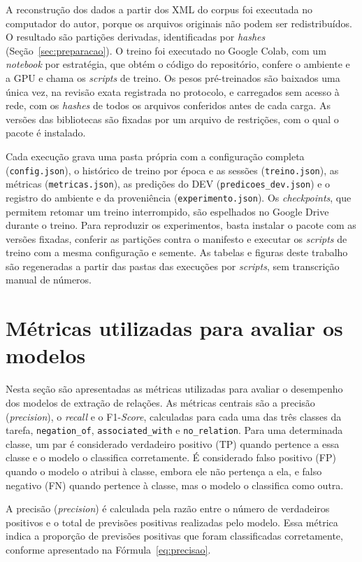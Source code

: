 A reconstrução dos dados a partir dos XML do corpus foi executada no
computador do autor, porque os arquivos originais não podem ser redistribuídos. O
resultado são partições derivadas, identificadas por \emph{hashes}
(Seção~\ref{sec:preparacao}). O treino foi executado no Google Colab, com
um \emph{notebook} por estratégia, que obtém o código do repositório, confere o
ambiente e a GPU e chama os \emph{scripts} de treino. Os pesos pré-treinados são
baixados uma única vez, na revisão exata registrada no protocolo, e carregados sem
acesso à rede, com os \emph{hashes} de todos os arquivos conferidos antes de cada
carga. As versões das bibliotecas são fixadas por um arquivo de restrições, com o
qual o pacote é instalado.

Cada execução grava uma pasta própria com a configuração completa
(\texttt{config.json}), o histórico de treino por época e as sessões
(\texttt{treino.json}), as métricas (\texttt{metricas.json}), as predições do DEV
(\texttt{predicoes\_dev.json}) e o registro do ambiente e da proveniência
(\texttt{experimento.json}). Os \emph{checkpoints}, que permitem retomar um treino
interrompido, são espelhados no Google Drive durante o treino. Para reproduzir os
experimentos, basta instalar o pacote com as versões fixadas, conferir as partições
contra o manifesto e executar os \emph{scripts} de treino com a mesma configuração e
semente. As tabelas e figuras deste trabalho são regeneradas a partir das pastas das
execuções por \emph{scripts}, sem transcrição manual de números.

\section{Métricas utilizadas para avaliar os modelos}
\label{sec:metricas}

Nesta seção são apresentadas as métricas utilizadas para avaliar o desempenho dos
modelos de extração de relações. As métricas centrais são a precisão
(\emph{precision}), o \emph{recall} e o F1-\emph{Score}, calculadas para cada uma das
três classes da tarefa, \texttt{negation\_of}, \texttt{associated\_with} e
\texttt{no\_relation}. Para uma determinada classe, um par é considerado verdadeiro positivo (TP) quando pertence a essa classe e o modelo o classifica corretamente. É considerado falso positivo (FP) quando o modelo o atribui à classe, embora ele não pertença a ela, e falso negativo (FN) quando pertence à classe, mas o modelo o classifica como outra.

A precisão (\emph{precision}) é calculada pela razão entre o número de verdadeiros
positivos e o total de previsões positivas realizadas pelo modelo. Essa métrica indica
a proporção de previsões positivas que foram classificadas corretamente, conforme
apresentado na Fórmula~\ref{eq:precisao}.

